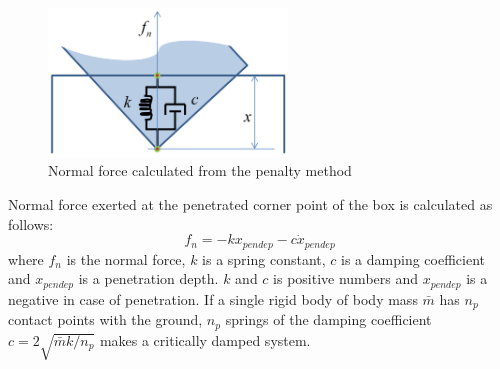 \documentclass{acm_proc_article-sp}
\begin{document}
\begin{figure}[h!]
  \centering
  \includegraphics[width=2.5in]{penalty}
  \caption{Normal force calculated from the penalty method}
\end{figure}

Normal force exerted at the penetrated corner point of the box is calculated as follows:
\begin{equation}\label{penalty-normal}
f_n = -k x_{pendep} - c \dot{x}_{pendep}
\end{equation}
where $f_n$ is the normal force, $k$ is a spring constant, $c$ is a damping coefficient and $x_{pendep}$ is
a penetration depth. $k$ and $c$ is positive numbers and $x_{pendep}$ is a negative in case of penetration.
If a single rigid body of body mass $\bar{m}$ has $n_p$ contact points with the ground,
$n_p$ springs of the damping coefficient $c=2\sqrt{\bar{m}k/n_p}$ makes a critically damped system.
\end{document}
